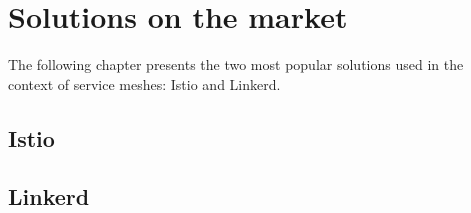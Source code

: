 \section{Solutions on the market}

The following chapter presents the two most popular solutions used in the context of service meshes: Istio and Linkerd.

\subsection{Istio}

\subsection{Linkerd}